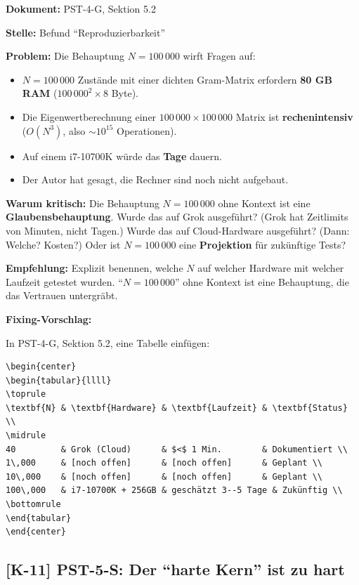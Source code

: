 \documentclass[11pt,a4paper]{article}
\newcommand{\K}[1]{\textbf{[K-#1]}}
\newcommand{\Dok}[1]{\noindent\textbf{Dokument:} #1\par\smallskip}
\newcommand{\Stelle}[1]{\noindent\textbf{Stelle:} #1\par\smallskip}
\newcommand{\Prob}[1]{\noindent\textbf{Problem:} #1\par\smallskip}
\newcommand{\Krit}[1]{\noindent\textbf{Warum kritisch:} #1\par\smallskip}
\newcommand{\Empf}[1]{\noindent\textbf{Empfehlung:} #1\par\smallskip}
\newenvironment{Fix}
  {\par\medskip\noindent\textbf{Fixing-Vorschlag:}\par\nobreak\smallskip}
  {\par\medskip}
\begin{document}
\Dok{PST-4-G, Sektion 5.2}
\Stelle{Befund ``Reproduzierbarkeit''}
\Prob{Die Behauptung $N = 100\,000$ wirft Fragen auf:
\begin{itemize}
  \item $N = 100\,000$ Zustände mit einer dichten Gram-Matrix
    erfordern \textbf{80 GB RAM} ($100\,000^2 \times 8$ Byte).
  \item Die Eigenwertberechnung einer $100\,000 \times 100\,000$
    Matrix ist \textbf{rechenintensiv} ($O(N^3)$, also $\sim 10^{15}$
    Operationen).
  \item Auf einem i7-10700K würde das \textbf{Tage} dauern.
  \item Der Autor hat gesagt, die Rechner sind noch nicht aufgebaut.
\end{itemize}}
\Krit{Die Behauptung $N = 100\,000$ ohne Kontext ist eine
\textbf{Glaubensbehauptung}. Wurde das auf Grok ausgeführt? (Grok
hat Zeitlimits von Minuten, nicht Tagen.) Wurde das auf Cloud-Hardware
ausgeführt? (Dann: Welche? Kosten?) Oder ist $N = 100\,000$ eine
\textbf{Projektion} für zukünftige Tests?}
\Empf{Explizit benennen, welche $N$ auf welcher Hardware mit welcher
Laufzeit getestet wurden. ``$N = 100\,000$'' ohne Kontext ist eine
Behauptung, die das Vertrauen untergräbt.}
\begin{Fix}
In PST-4-G, Sektion 5.2, eine Tabelle einfügen:
\begin{verbatim}
\begin{center}
\begin{tabular}{llll}
\toprule
\textbf{N} & \textbf{Hardware} & \textbf{Laufzeit} & \textbf{Status} \\
\midrule
40         & Grok (Cloud)      & $<$ 1 Min.        & Dokumentiert \\
1\,000     & [noch offen]      & [noch offen]      & Geplant \\
10\,000    & [noch offen]      & [noch offen]      & Geplant \\
100\,000   & i7-10700K + 256GB & geschätzt 3--5 Tage & Zukünftig \\
\bottomrule
\end{tabular}
\end{center}
\end{verbatim}
\end{Fix}

\subsection{\K{11} PST-5-S: Der ``harte Kern'' ist zu hart}
\end{document}
